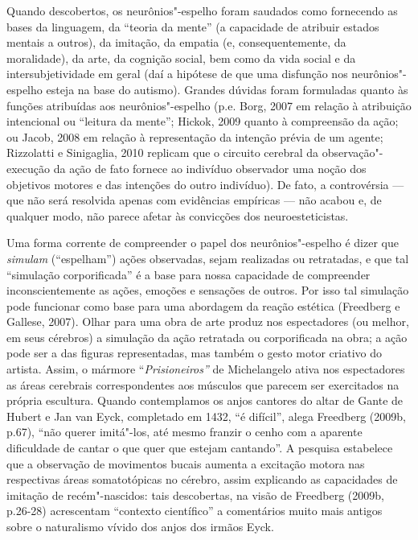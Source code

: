 Quando descobertos, os neurônios"-espelho foram saudados como fornecendo
as bases da linguagem, da ``teoria da mente'' (a capacidade de atribuir
estados mentais a outros), da imitação, da empatia (e, consequentemente,
da moralidade), da arte, da cognição social, bem como da vida social e
da intersubjetividade em geral (daí a hipótese de que uma disfunção nos
neurônios"-espelho esteja na base do autismo). Grandes dúvidas foram
formuladas quanto às funções atribuídas aos neurônios"-espelho (p.e.
Borg, 2007 em relação à atribuição intencional ou ``leitura da mente'';
Hickok, 2009 quanto à compreensão da ação; ou Jacob, 2008 em relação à
representação da intenção prévia de um agente; Rizzolatti e Sinigaglia,
2010 replicam que o circuito cerebral da observação"-execução da ação de
fato fornece ao indivíduo observador uma noção dos objetivos motores e
das intenções do outro indivíduo). De fato, a controvérsia --- que não
será resolvida apenas com evidências empíricas --- não acabou e, de
qualquer modo, não parece afetar às convicções dos neuroesteticistas.

Uma forma corrente de compreender o papel dos neurônios"-espelho é dizer
que \emph{simulam} (``espelham'') ações observadas, sejam realizadas ou
retratadas, e que tal ``simulação corporificada'' é a base para nossa
capacidade de compreender inconscientemente as ações, emoções e
sensações de outros. Por isso tal simulação pode funcionar como base
para uma abordagem da reação estética (Freedberg e Gallese, 2007). Olhar
para uma obra de arte produz nos espectadores (ou melhor, em seus
cérebros) a simulação da ação retratada ou corporificada na obra; a ação
pode ser a das figuras representadas, mas também o gesto motor criativo
do artista. Assim, o mármore ``\emph{Prisioneiros''} de Michelangelo
ativa nos espectadores as áreas cerebrais correspondentes aos músculos
que parecem ser exercitados na própria escultura. Quando contemplamos os
anjos cantores do altar de Gante de Hubert e Jan van Eyck, completado em
1432, ``é difícil'', alega Freedberg (2009b, p.67), ``não querer
imitá"-los, até mesmo franzir o cenho com a aparente dificuldade de
cantar o que quer que estejam cantando''. A pesquisa estabelece que a
observação de movimentos bucais aumenta a excitação motora nas
respectivas áreas somatotópicas no cérebro, assim explicando as
capacidades de imitação de recém"-nascidos: tais descobertas, na visão de
Freedberg (2009b, p.26-28) acrescentam ``contexto científico'' a
comentários muito mais antigos sobre o naturalismo vívido dos anjos dos
irmãos Eyck.

